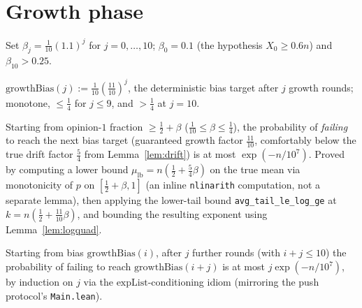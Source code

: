 \section{Growth phase}\label{sec:growth}

Set $\beta_j = \tfrac1{10}(1.1)^j$ for $j=0,\dots,10$; $\beta_0=0.1$ (the
hypothesis $X_0\ge0.6n$) and $\beta_{10}>0.25$.

\begin{definition}\label{def:growthbias}
  \leanok
  $\mathrm{growthBias}(j) := \tfrac1{10}(\tfrac{11}{10})^j$, the deterministic
  bias target after $j$ growth rounds; monotone, $\le\tfrac14$ for $j\le9$,
  and $>\tfrac14$ at $j=10$.
\end{definition}

\begin{lemma}\label{lem:growthround}
  \leanok
  Starting from opinion-$1$ fraction $\ge\tfrac12+\beta$
  ($\tfrac1{10}\le\beta\le\tfrac14$), the probability of \emph{failing} to
  reach the next bias target (guaranteed growth factor $\tfrac{11}{10}$,
  comfortably below the true drift factor $\tfrac54$ from
  Lemma~\ref{lem:drift}) is at most $\exp(-n/10^7)$. Proved by computing a
  lower bound $\mu_{\mathrm{lb}} = n(\tfrac12+\tfrac54\beta)$ on the true
  mean via monotonicity of $p$ on $[\tfrac12+\beta,1]$ (an inline
  \texttt{nlinarith} computation, not a separate lemma), then applying the
  lower-tail bound \texttt{avg\_tail\_le\_log\_ge} at
  $k=n(\tfrac12+\tfrac{11}{10}\beta)$, and bounding the resulting exponent
  using Lemma~\ref{lem:logquad}.
\end{lemma}

\begin{lemma}\label{lem:growthfail}
  \leanok
  Starting from bias $\mathrm{growthBias}(i)$, after $j$ further rounds
  (with $i+j\le10$) the probability of failing to reach
  $\mathrm{growthBias}(i+j)$ is at most $j\exp(-n/10^7)$, by induction on
  $j$ via the $\mathrm{expList}$-conditioning idiom (mirroring the push
  protocol's \texttt{Main.lean}).
\end{lemma}

